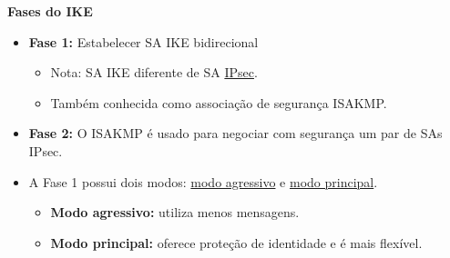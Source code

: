     \textbf{Fases do IKE}
    \begin{itemize}[left=0.5cm, align=left, nosep]
        \item \textbf{Fase 1:} Estabelecer SA IKE bidirecional
        \begin{itemize}[left=0.5cm, nosep, label=$\hookrightarrow$]
            \item Nota: SA IKE diferente de SA \underline{IPsec}.
            \item Também conhecida como associação de segurança ISAKMP.
        \end{itemize}
        \item \textbf{Fase 2:} O ISAKMP é usado para negociar com segurança um par de SAs IPsec.
        \item A Fase 1 possui dois modos: \underline{modo agressivo} e \underline{modo principal}.
        \begin{itemize}[left=0.5cm, nosep, label=$\hookrightarrow$]
            \item \textbf{Modo agressivo:} utiliza menos mensagens.
            \item \textbf{Modo principal:} oferece proteção de identidade e é mais flexível.
        \end{itemize}
    \end{itemize} 
